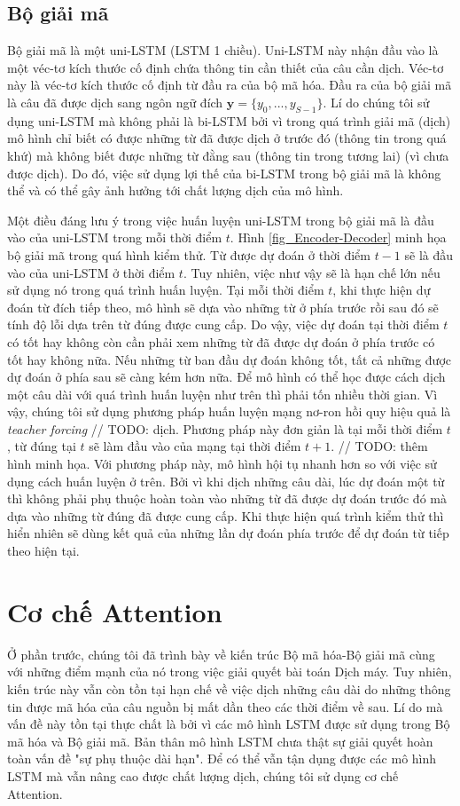 \subsection{Bộ giải mã}
Bộ giải mã là một uni-LSTM (LSTM 1 chiều). Uni-LSTM này nhận đầu vào là một véc-tơ kích thước cố định chứa thông tin cần thiết của câu cần dịch. Véc-tơ này là véc-tơ kích thước cố định từ đầu ra của bộ mã hóa. Đầu ra của bộ giải mã là câu đã được dịch sang ngôn ngữ đích $\bm{y} = \{y_0, ..., y_{S-1}\}$.
Lí do chúng tôi sử dụng uni-LSTM mà không phải là bi-LSTM bởi vì trong quá trình giải mã (dịch) mô hình chỉ biết có được những từ đã được dịch ở trước đó (thông tin trong quá khứ) mà không biết được những từ đằng sau (thông tin trong tương lai) (vì chưa được dịch). Do đó, việc sử dụng lợi thế của bi-LSTM trong bộ giải mã là không thể và có thể gây ảnh hưởng tới chất lượng dịch của mô hình.

Một điều đáng lưu ý trong việc huấn luyện uni-LSTM trong bộ giải mã là đầu vào của uni-LSTM trong mỗi thời điểm $t$. Hình \ref{fig_Encoder-Decoder} minh họa bộ giải mã trong quá hình kiểm thử. Từ được dự đoán ở thời điểm $t-1$ sẽ là đầu vào của uni-LSTM ở thời điểm $t$. Tuy nhiên, việc như vậy sẽ là hạn chế lớn nếu sử dụng nó trong quá trình huấn luyện. Tại mỗi thời điểm $t$, khi thực hiện dự đoán từ đích tiếp theo, mô hình sẽ dựa vào những từ ở phía trước rồi sau đó sẽ tính độ lỗi dựa trên từ đúng được cung cấp. Do vậy, việc dự đoán tại thời điểm $t$ có tốt hay không còn cần phải xem những từ đã được dự đoán ở phía trước có tốt hay không nữa. Nếu những từ ban đầu dự đoán không tốt, tất cả những được dự đoán ở phía sau sẽ càng kém hơn nữa. Để mô hình có thể học được cách dịch một câu dài với quá trình huấn luyện như trên thì phải tốn nhiều thời gian. Vì vậy, chúng tôi sử dụng phương pháp huấn luyện mạng nơ-ron hồi quy hiệu quả là \textit{teacher forcing} // TODO: dịch. Phương pháp này đơn giản là tại mỗi thời điểm $t$, từ đúng tại $t$ sẽ làm đầu vào của mạng tại thời điểm $t+1$. // TODO: thêm hình minh họa. Với phương pháp này, mô hình hội tụ nhanh hơn so với việc sử dụng cách huấn luyện ở trên. Bởi vì khi dịch những câu dài, lúc dự đoán một từ thì không phải phụ thuộc hoàn toàn vào những từ đã được dự đoán trước đó mà dựa vào những từ đúng đã được cung cấp. Khi thực hiện quá trình kiểm thử thì hiển nhiên sẽ dùng kết quả của những lần dự đoán phía trước để dự đoán từ tiếp theo hiện tại. 



\section{Cơ chế Attention}
Ở phần trước, chúng tôi đã trình bày về kiến trúc Bộ mã hóa-Bộ giải mã cùng với những điểm mạnh của nó trong việc giải quyết bài toán Dịch máy. Tuy nhiên, kiến trúc này vẫn còn tồn tại hạn chế về việc dịch những câu dài do những thông tin được mã hóa của câu nguồn bị mất dần theo các thời điểm về sau. Lí do mà vấn đề này tồn tại thực chất là bởi vì các mô hình LSTM được sử dụng trong Bộ mã hóa và Bộ giải mã. Bản thân mô hình LSTM chưa thật sự giải quyết hoàn toàn vấn đề "sự phụ thuộc dài hạn". Để có thể vẫn tận dụng được các mô hình LSTM mà vẫn nâng cao được chất lượng dịch, chúng tôi sử dụng cơ chế Attention.

